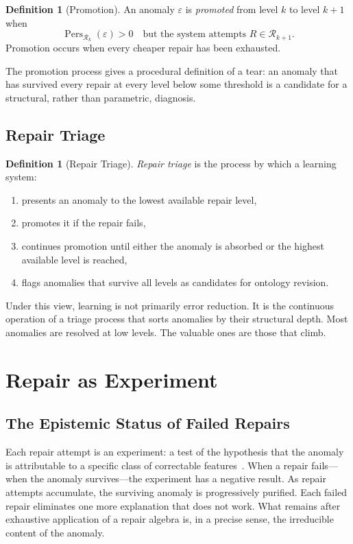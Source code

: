 \documentclass[12pt,oneside]{book}
\theoremstyle{plain}
\theoremstyle{definition}
\newtheorem{definition}[theorem]{Definition}
\theoremstyle{remark}
\DeclareMathOperator{\Pers}{Pers}
\newcommand{\R}{\mathcal{R}}
\newcommand{\eps}{\varepsilon}
\newcommand{\1}{\mathbf{1}}
\begin{document}
\begin{definition}[Promotion]
An anomaly $\eps$ is \emph{promoted} from level $k$ to level $k+1$ when
\[
\Pers_{\R_k}(\eps) > 0 \quad \text{but the system attempts } R \in \R_{k+1}.
\]
Promotion occurs when every cheaper repair has been exhausted.
\end{definition}

The promotion process gives a procedural definition of a tear: an anomaly that has survived every repair at every level below some threshold is a candidate for a structural, rather than parametric, diagnosis.

\section{Repair Triage}

\begin{definition}[Repair Triage]
\emph{Repair triage} is the process by which a learning system:
\begin{enumerate}[label=(\roman*)]
\item presents an anomaly to the lowest available repair level,
\item promotes it if the repair fails,
\item continues promotion until either the anomaly is absorbed or the highest available level is reached,
\item flags anomalies that survive all levels as candidates for ontology revision.
\end{enumerate}
\end{definition}

Under this view, learning is not primarily error reduction. It is the continuous operation of a triage process that sorts anomalies by their structural depth. Most anomalies are resolved at low levels. The valuable ones are those that climb.


\chapter{Repair as Experiment}

\section{The Epistemic Status of Failed Repairs}

Each repair attempt is an experiment: a test of the hypothesis that the anomaly is attributable to a specific class of correctable features~\cite{popper1959,hanson1958}. When a repair fails---when the anomaly survives---the experiment has a negative result. As repair attempts accumulate, the surviving anomaly is progressively purified. Each failed repair eliminates one more explanation that does not work. What remains after exhaustive application of a repair algebra is, in a precise sense, the irreducible content of the anomaly.
\end{document}
